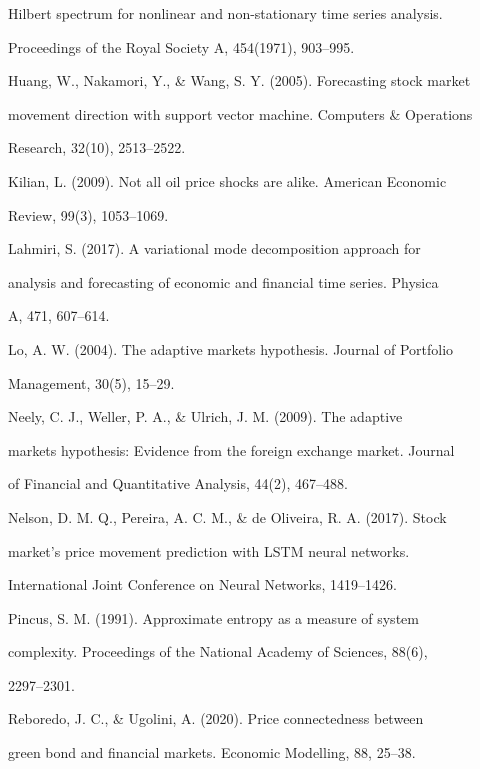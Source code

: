 Hilbert spectrum for nonlinear and non-stationary time series analysis.

Proceedings of the Royal Society A, 454(1971), 903--995.



Huang, W., Nakamori, Y., \& Wang, S. Y. (2005). Forecasting stock market

movement direction with support vector machine. Computers \& Operations

Research, 32(10), 2513--2522.



Kilian, L. (2009). Not all oil price shocks are alike. American Economic

Review, 99(3), 1053--1069.



Lahmiri, S. (2017). A variational mode decomposition approach for

analysis and forecasting of economic and financial time series. Physica

A, 471, 607--614.



Lo, A. W. (2004). The adaptive markets hypothesis. Journal of Portfolio

Management, 30(5), 15--29.



Neely, C. J., Weller, P. A., \& Ulrich, J. M. (2009). The adaptive

markets hypothesis: Evidence from the foreign exchange market. Journal

of Financial and Quantitative Analysis, 44(2), 467--488.



Nelson, D. M. Q., Pereira, A. C. M., \& de Oliveira, R. A. (2017). Stock

market's price movement prediction with LSTM neural networks.

International Joint Conference on Neural Networks, 1419--1426.



Pincus, S. M. (1991). Approximate entropy as a measure of system

complexity. Proceedings of the National Academy of Sciences, 88(6),

2297--2301.



Reboredo, J. C., \& Ugolini, A. (2020). Price connectedness between

green bond and financial markets. Economic Modelling, 88, 25--38.



